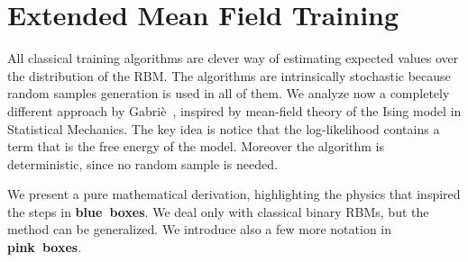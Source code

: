 
\section{Extended Mean Field Training}
All classical training algorithms are clever way of estimating expected values
over the distribution of the RBM. The algorithms are intrinsically stochastic
because random samples generation is used in all of them. We analyze now a completely
different approach by Gabriè~\cite{gabrie18training}, inspired by mean-field
theory of the  Ising model in Statistical Mechanics. The key idea is notice that the
log-likelihood contains a term that is the free energy of the model. Moreover the
algorithm is deterministic, since no random sample is needed.

We present a pure mathematical derivation, highlighting the physics that inspired the
steps in {\bf \color{physics-blue}blue~boxes}. We deal only with classical binary RBMs,
but the method can be generalized. We introduce also a few more notation in
{\bf \color{pink-notation}pink~boxes}.

\newcommand{\FEn}[2]{F{\left[#1;#2\right]}}
\newcommand{\Gam}[2]{\Gamma{\left[#1;#2\right]}}
\newcommand{\DistributionMean}[4]{\left\langle#1\right\rangle_{#4{\left[#2;#3\right]}}}
\newcommand{\Fmean}[3]{\DistributionMean{#1}{#2}{#3}{f}}
\newcommand{\Gmean}[3]{\DistributionMean{#1}{#2}{#3}{\gamma}}
\newcommand{\qhat}[1]{\vec{\hat{q}}{(#1)}}
\newcommand{\Lambd}[2]{\vec{\lambda}{\left[#1;#2\right]}}

\newcommand{\lgt}[2]{\lambda_t{\left[#1;#2\right]}}
\newcommand{\lvi}[2]{\lambda_i^v{\left[#1;#2\right]}}
\newcommand{\lhj}[2]{\lambda_j^h{\left[#1;#2\right]}}
\newcommand{\lgtz}[1]{\lgt{#1}{0}}
\newcommand{\lviz}[1]{\lvi{#1}{0}}
\newcommand{\lhjz}[1]{\lhj{#1}{0}}
\newcommand{\lgtm}[1]{\lgt{\vec{m}}{#1}}
\newcommand{\lvim}[1]{\lvi{\vec{m}}{#1}}
\newcommand{\lhjm}[1]{\lhj{\vec{m}}{#1}}
\newcommand{\lgtmz}{\lgt{\vec{m}}{0}}
\newcommand{\lvimz}{\lvi{i\vec{m}}{0}}
\newcommand{\lhjmz}{\lhj{\vec{m}}{0}}

\newcommand{\mgt}{m_t}
\newcommand{\mvi}{m_i^v}
\newcommand{\mhj}{m_j^h}
\newcommand{\mvisq}{{\left(m_i^v\right)}^2}
\newcommand{\mhjsq}{{\left(m_j^h\right)}^2}

\newcommand{\hmgt}{\hat{m}_t}
\newcommand{\hmvi}{\hat{m}_i^v}
\newcommand{\hmhj}{\hat{m}_j^h}
\newcommand{\hmvisq}{{\left(\hat{m}_i^v\right)}^2}
\newcommand{\hmhjsq}{{\left(\hat{m}_j^h\right)}^2}


